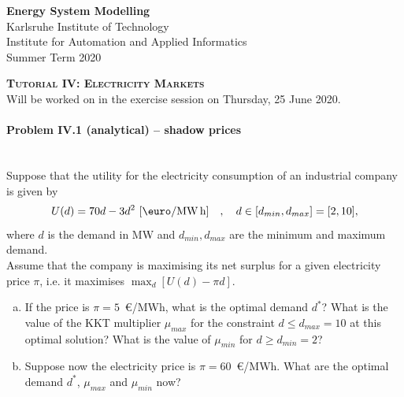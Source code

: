 \documentclass[11pt,a4paper,fleqn]{scrartcl}
\begin{document}
\begin{flushright}
 \textbf{Energy System Modelling }\\
 {\small Karlsruhe Institute of Technology}\\
 {\small Institute for Automation and Applied Informatics}\\
 {\small Summer Term 2020}\\
\end{flushright}

 
 \vspace{-0.5em}
 \hrulefill
 \vspace{0.3em}

\begin{center}
 \textbf{\textsc{\Large Tutorial IV: Electricity Markets}}\\
 \small Will be worked on in the exercise session on Thursday, 25 June 2020.\\[1.5em]
\end{center}

\vspace{-0.5em}
\hrulefill
\vspace{0.8em}

\paragraph{Problem IV.1 (analytical) -- shadow prices \faGroup}~\\

Suppose that the utility for the electricity consumption of an industrial company is given by
\[
 U(d) = 70d - 3d^2 ~[\textrm{\euro}/\si{\mega\watt\hour}] \quad , \quad d\in [d_{min},d_{max}]=[2,10],
\]
where $d$ is the demand in MW and $d_{min}, d_{max}$ are the minimum and maximum demand. \\
[1em]
Assume that the company is maximising its net surplus for a given electricity price $\pi$, i.e. it maximises $\max_{d} \left[U(d) -
  \pi d\right]$.
\begin{enumerate}[(a)]
 \item  If the price is $\pi = 5$~\euro/MWh, what is the optimal
       demand $d^*$?  What is the value of the KKT multiplier $\mu_{max}$
       for the constraint $d \leq d_{max}=10$ at this optimal solution?
       What is the value of $\mu_{min}$ for $d \geq d_{min} = 2$?
 \item Suppose now the electricity price is $\pi = 60$~\euro/MWh. What are
       the optimal demand $d^*$, $\mu_{max}$ and $\mu_{min}$ now?
\end{enumerate}
\end{document}
